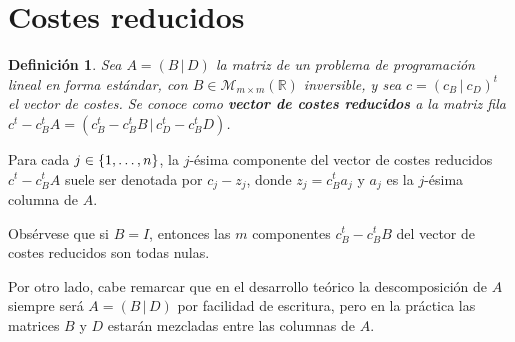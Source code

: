 \documentclass[11pt]{report}
\theoremstyle{mytheorem}
\theoremstyle{mydefinition}
\newtheorem{definition}{Definición}
\theoremstyle{myexample}
\newenvironment{cdefinition} %
  {\begin{mdframed}[
        linewidth=3pt,
        linecolor=c1,
        bottomline=false,
        topline=false,
        rightline=false,
        innerrightmargin=0pt,
        innertopmargin=0pt,
        innerbottommargin=0pt,
        innerleftmargin=1em,
        skipabove=\baselineskip]
    \begin{definition}}
  {\end{definition}\end{mdframed}}
\newcommand{\R}{\mathbb R}
\newcommand{\mybf}[1]{\boldmath\textbf{\color{c1}#1}\unboldmath} %
\begin{document}
\section{Costes reducidos}

\begin{cdefinition}
Sea  $A = (B \, | \, D)$ la matriz de un problema de programación lineal en forma estándar, con $B \in \mathcal{M}_{m \times m}(\R)$ inversible, y sea $c = (c_B \, | \ c_D)^t$ el vector de costes. Se conoce como {\mybf{vector de costes reducidos}} a la matriz fila $c^t-c_B^tA = (c_B^t-c_B^tB \, | \, c_D^t -c_B^tD)$.
\end{cdefinition}

Para cada $j \in \{1,\mathellipsis,n\}$, la $j$-ésima componente del vector de costes reducidos $c^t-c_B^tA$ suele ser denotada por $c_j-z_j$, donde $z_j = c_B^ta_j$ y $a_j$ es la $j$-ésima columna de $A$.



Obsérvese que si $B = I$, entonces las $m$ componentes $c_B^t-c_B^tB$ del vector de costes reducidos son todas nulas.



Por otro lado, cabe remarcar que en el desarrollo teórico la descomposición de $A$ siempre será $A = (B \, | \, D)$ por facilidad de escritura, pero en la práctica las matrices $B$ y $D$ estarán mezcladas entre las columnas de $A$.
\end{document}
